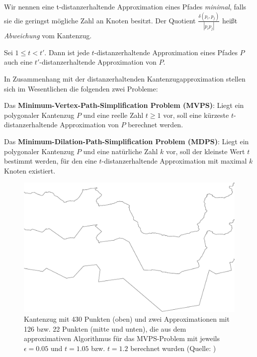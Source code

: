 	Wir nennen eine t-distanzerhaltende Approximation eines Pfades \emph{minimal}, falls sie die geringst mögliche Zahl an Knoten besitzt.
	Der Quotient $\frac{\delta(p_i, p_j)}{|p_ip_j|}$ heißt \emph{Abweichung} vom Kantenzug.
	\begin{corollary}
		\label{cor:approximations}
		Sei $1 \leq t < t'$. Dann ist jede $t$-distanzerhaltende Approximation eines Pfades $P$ auch eine $t'$-distanzerhaltende Approximation von $P$.
	\end{corollary}

	In Zusammenhang mit der distanzerhaltenden Kantenzugapproximation stellen sich im Wesentlichen die folgenden zwei Probleme:
	
	\noindent Das \textbf{Minimum-Vertex-Path-Simplification Problem (MVPS)}: Liegt ein polygonaler Kantenzug $P$ und eine reelle Zahl $t \geq 1$ vor, soll eine kürzeste $t$-distanzerhaltende Approximation von $P$ berechnet werden.
	
	\noindent Das \textbf{Minimum-Dilation-Path-Simplification Problem (MDPS)}: Liegt ein polygonaler Kantenzug $P$ und eine natürliche Zahl $k$ vor, soll der kleinste Wert $t$ bestimmt werden, für den eine $t$-distanzerhaltende Approximation mit maximal $k$ Knoten existiert.

    \begin{figure}
    	\centering
    	\begin{minipage}{.8\linewidth}
    		 \includegraphics[scale=0.15]{approximation_example}
    	\end{minipage}
    	\caption{Kantenzug mit 430 Punkten (oben) und zwei Approximationen mit 126 bzw. 22 Punkten (mitte und unten), die aus dem approximativen Algorithmus für das MVPS-Problem mit jeweils $\epsilon = 0.05$ und $t = 1.05$ bzw. $t = 1.2$ berechnet wurden (Quelle: \cite{gudmundsson})}
    \end{figure}
